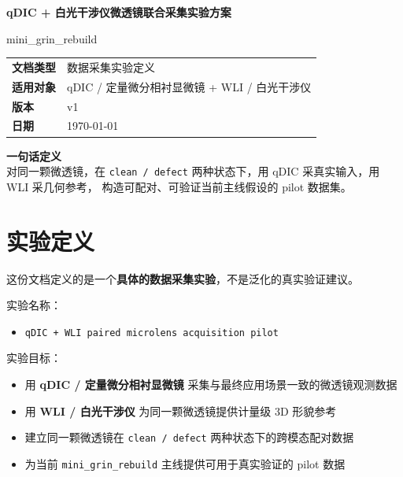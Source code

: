 \documentclass[UTF8,a4paper,11pt]{ctexart}
\newcommand{\Code}[1]{\texttt{#1}}
\newcommand{\Strong}[1]{\textbf{#1}}
\begin{document}
\begin{titlepage}
  \centering
  {\LARGE \bfseries qDIC + 白光干涉仪微透镜联合采集实验方案\par}
  \vspace{1.2em}
  {\large mini\_grin\_rebuild\par}
  \vspace{2.5em}

  \begin{tabular}{>{\bfseries}p{} p{}}
    文档类型 & 数据采集实验定义 \\
    适用对象 & qDIC / 定量微分相衬显微镜 + WLI / 白光干涉仪 \\
    版本 & v1 \\
    日期 & \today \\
  \end{tabular}

  \vfill

  \begin{minipage}{0.92\textwidth}
    \textbf{一句话定义} \\
    对同一颗微透镜，在 \Code{clean / defect} 两种状态下，用 qDIC 采真实输入，用 WLI 采几何参考，
    构造可配对、可验证当前主线假设的 pilot 数据集。
  \end{minipage}

  \vfill
\end{titlepage}

\tableofcontents
\newpage

\section{实验定义}

这份文档定义的是一个\Strong{具体的数据采集实验}，不是泛化的真实验证建议。

实验名称：
\begin{itemize}
  \item \Code{qDIC + WLI paired microlens acquisition pilot}
\end{itemize}

实验目标：
\begin{itemize}
  \item 用 \Strong{qDIC / 定量微分相衬显微镜} 采集与最终应用场景一致的微透镜观测数据
  \item 用 \Strong{WLI / 白光干涉仪} 为同一颗微透镜提供计量级 3D 形貌参考
  \item 建立同一颗微透镜在 \Code{clean / defect} 两种状态下的跨模态配对数据
  \item 为当前 \Code{mini\_grin\_rebuild} 主线提供可用于真实验证的 pilot 数据
\end{itemize}
\end{document}
